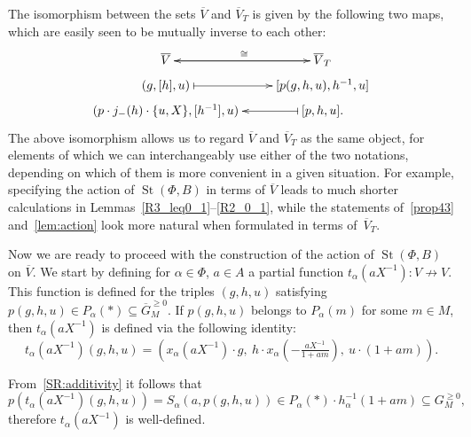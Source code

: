 \documentclass[oneside, 8pt]{amsart}
\theoremstyle{remark}
\theoremstyle{definition}
\numberwithin{lemma}{section}
\numberwithin{prop}{section}
\numberwithin{corollary}{section}
\numberwithin{externaltheorem}{section}
\DeclareMathOperator{\St}{St}
\numberwithin{equation}{section}
\begin{document}
The isomorphism between the sets $\overline{V}$ and $\overline{V}_T$ is given by the following two maps, which are easily seen to be mutually inverse to each other:
\begin{equation} \label{eq:VVT} \xymatrix @R0.3pc {\overline{V} \ar[r]^{\cong} & \ar[l] \overline{V}_T \\ (g, [h], u) \ar@{|->}[r] & [p(g, h, u), h^{-1}, u] \\ (p \cdot j_-(h) \cdot \{u, X\}, [h^{-1}], u) & \ar@{|->}[l] [p, h, u]. } \end{equation}
The above isomorphism allows us to regard $\overline{V}$ and $\overline{V}_T$ as the same object, for elements of which we can interchangeably use either of the two notations,
 depending on which of them is more convenient in a given situation.
For example, specifying the action of $\St(\Phi, B)$ in terms of $\overline{V}$ leads to much shorter calculations in Lemmas~\ref{R3_leq0_1}--\ref{R2_0_1},
 while the statements of~\cref{prop43} and~\cref{lem:action} look more natural when formulated in terms of~$\overline{V}_T$.

Now we are ready to proceed with the construction of the action of $\St(\Phi, B)$ on $\overline{V}$. We start by defining for $\alpha \in \Phi$, $a \in A$ a partial function $t_\alpha(aX^{-1}) \colon V \not\to V$.
This function is defined for the triples $(g, h, u)$ satisfying $p(g, h, u) \in P_\alpha(*) \subseteq \overline{G}_M^{\geq 0}$.
If $p(g, h, u)$ belongs to $P_\alpha(m)$ for some $m \in M$, then $t_\alpha(aX^{-1})$ is defined via the following identity:
\begin{equation} \label{T_1} t_\alpha(aX^{-1}) (g, h, u) = \left( x_\alpha(aX^{-1})\cdot g ,\ h \cdot x_\alpha\left(-\tfrac{aX^{-1}}{1 + am}\right),\ u \cdot (1 + am)\right).\end{equation}

From~\cref{SR:additivity} it follows that
\[p\left(t_\alpha(aX^{-1}) (g, h, u)\right) = S_\alpha(a, p(g, h, u)) \in P_\alpha(*) \cdot h_{\alpha}^{-1}(1+am) \subseteq G_M^{\geq 0},\]
therefore $t_\alpha(aX^{-1})$ is well-defined.
\end{document}
